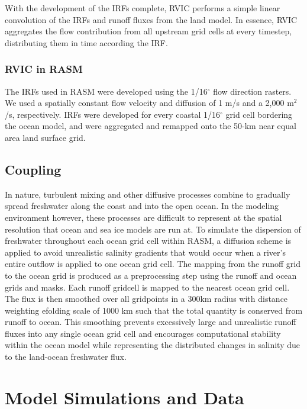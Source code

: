 \documentclass[ms, draft]{agutex}
\begin{document}
\begin{article}
With the development of the IRFs complete, RVIC performs a simple linear convolution of the IRFs and runoff fluxes from the land model.
In essence, RVIC aggregates the flow contribution from all upstream grid cells at every timestep, distributing them in time according the IRF.

\subsubsection{RVIC in RASM}

The IRFs used in RASM were developed using the \citet{Wu_2011} 1/16$^{\circ}$ flow direction rasters.
We used a spatially constant flow velocity and diffusion of 1 m/s and a 2,000 m$^2$/s, respectively.
IRFs were developed for every coastal 1/16$^{\circ}$ grid cell bordering the ocean model, and were aggregated and remapped onto the 50-km near equal area land surface grid.

\subsection{Coupling}

In nature, turbulent mixing and other diffusive processes combine to gradually spread freshwater along the coast and into the open ocean.
In the modeling environment however, these processes are difficult to represent at the spatial resolution that ocean and sea ice models are run at.
To simulate the dispersion of freshwater throughout each ocean grid cell within RASM, a diffusion scheme is applied to avoid unrealistic salinity gradients that would occur when a river’s entire outflow is applied to one ocean grid cell.
The mapping from the runoff grid to the ocean grid is produced as a preprocessing step using the runoff and ocean grids and masks.
Each runoff gridcell is mapped to the nearest ocean grid cell.
The flux is then smoothed over all gridpoints in a 300km radius with distance weighting efolding scale of 1000 km such that the total quantity is conserved from runoff to ocean.
This smoothing prevents excessively large and unrealistic runoff fluxes into any single ocean grid cell and encourages computational stability within the ocean model while representing the distributed changes in salinity due to the land-ocean freshwater flux.

\section{Model Simulations and Data}


\end{article}
\end{document}
